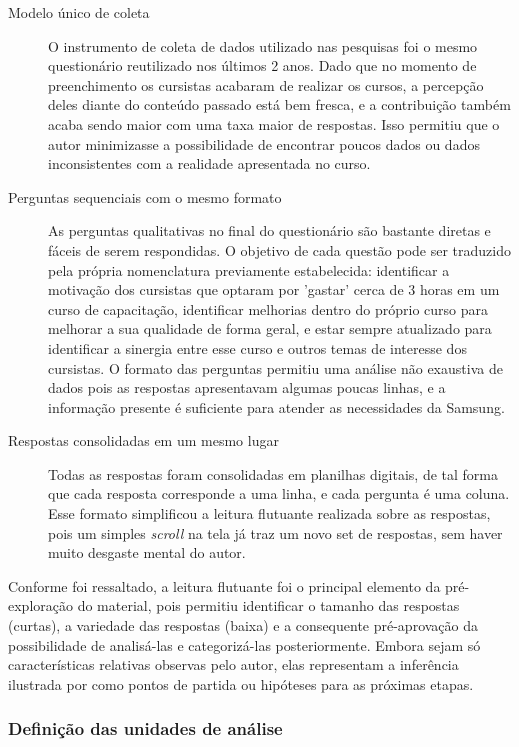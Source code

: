 \begin{description}
\item[Modelo único de coleta] O instrumento de coleta de dados utilizado nas pesquisas foi o mesmo questionário reutilizado nos últimos 2 anos. Dado que no momento de preenchimento os cursistas acabaram de realizar os cursos, a percepção deles diante do conteúdo passado está bem fresca, e a contribuição também acaba sendo maior com uma taxa maior de respostas. Isso permitiu que o autor minimizasse a possibilidade de encontrar poucos dados ou dados inconsistentes com a realidade apresentada no curso.
\item[Perguntas sequenciais com o mesmo formato] As perguntas qualitativas no final do questionário são bastante diretas e fáceis de serem respondidas. O objetivo de cada questão pode ser traduzido pela própria nomenclatura previamente estabelecida: identificar a motivação dos cursistas que optaram por 'gastar' cerca de 3 horas em um curso de capacitação, identificar melhorias dentro do próprio curso para melhorar a sua qualidade de forma geral, e estar sempre atualizado para identificar a sinergia entre esse curso e outros temas de interesse dos cursistas. O formato das perguntas permitiu uma análise não exaustiva de dados pois as respostas apresentavam algumas poucas linhas, e a informação presente é suficiente para atender as necessidades da Samsung.
\item[Respostas consolidadas em um mesmo lugar] Todas as respostas foram consolidadas em planilhas digitais, de tal forma que cada resposta corresponde a uma linha, e cada pergunta é uma coluna. Esse formato simplificou a leitura flutuante realizada sobre as respostas, pois um simples \textit{scroll} na tela já traz um novo set de respostas, sem haver muito desgaste mental do autor.
\end{description}

Conforme foi ressaltado, a leitura flutuante foi o principal elemento da pré-exploração do material, pois permitiu identificar o tamanho das respostas (curtas), a variedade das respostas (baixa) e a consequente pré-aprovação da possibilidade de analisá-las e categorizá-las posteriormente. Embora sejam só características relativas observas pelo autor, elas representam a inferência ilustrada por  como pontos de partida ou hipóteses para as próximas etapas.

\subsubsection*{Definição das unidades de análise}

